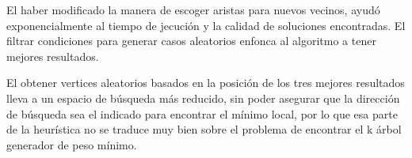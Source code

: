 \documentclass[a4paper]{report}
\begin{document}
El haber modificado la manera de escoger aristas para nuevos vecinos, ayud\'o exponencialmente al tiempo de jecuci\'on y la calidad de soluciones encontradas. El filtrar condiciones para generar casos aleatorios enfonca al algoritmo a tener mejores resultados.

El obtener vertices aleatorios basados en la posici\'on de los tres mejores resultados lleva a un espacio de
b\'usqueda m\'as reducido, sin poder asegurar que la direcci\'on de b\'usqueda sea el indicado para encontrar
el m\'inimo local, por lo que esa parte de la heur\'istica no se traduce muy bien sobre el problema de
encontrar el k \'arbol generador de peso m\'inimo. 

{}

\end{document}
